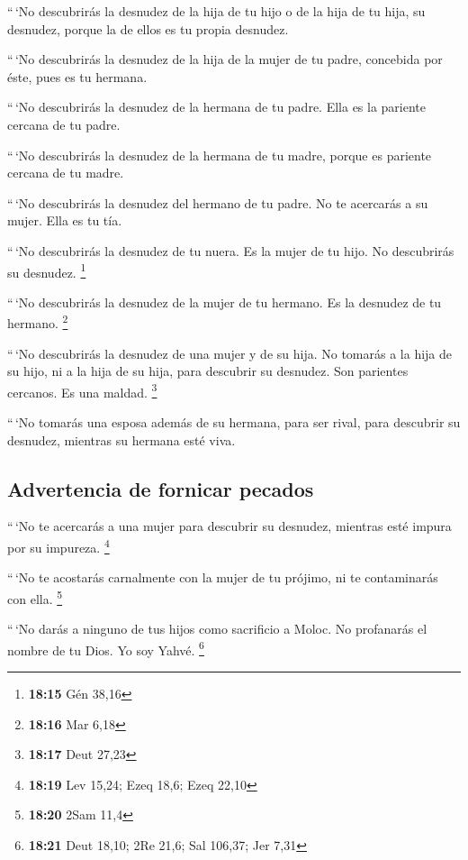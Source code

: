 \begin{paracol}{2}
 ``\,`No descubrirás la desnudez de la hija de tu hijo o
de la hija de tu hija, su desnudez, porque la de ellos es tu propia
desnudez.

 ``\,`No descubrirás la desnudez de la hija de la mujer
de tu padre, concebida por éste, pues es tu hermana.

 ``\,`No descubrirás la desnudez de la hermana de tu
padre. Ella es la pariente cercana de tu padre.

 ``\,`No descubrirás la desnudez de la hermana de tu
madre, porque es pariente cercana de tu madre.

 ``\,`No descubrirás la desnudez del hermano de tu padre.
No te acercarás a su mujer. Ella es tu tía.

 ``\,`No descubrirás la desnudez de tu nuera. Es la mujer
de tu hijo. No descubrirás su desnudez. \footnote{\textbf{18:15} Gén
  38,16}

 ``\,`No descubrirás la desnudez de la mujer de tu
hermano. Es la desnudez de tu hermano. \footnote{\textbf{18:16} Mar 6,18}

 ``\,`No descubrirás la desnudez de una mujer y de su
hija. No tomarás a la hija de su hijo, ni a la hija de su hija, para
descubrir su desnudez. Son parientes cercanos. Es una maldad.
\footnote{\textbf{18:17} Deut 27,23}

 ``\,`No tomarás una esposa además de su hermana, para
ser rival, para descubrir su desnudez, mientras su hermana esté viva.

\hypertarget{advertencia-de-fornicar-pecados}{%
\subsection{Advertencia de fornicar
pecados}\label{advertencia-de-fornicar-pecados}}

 ``\,`No te acercarás a una mujer para descubrir su
desnudez, mientras esté impura por su impureza. \footnote{\textbf{18:19}
  Lev 15,24; Ezeq 18,6; Ezeq 22,10}

 ``\,`No te acostarás carnalmente con la mujer de tu
prójimo, ni te contaminarás con ella. \footnote{\textbf{18:20} 2Sam 11,4}

 ``\,`No darás a ninguno de tus hijos como sacrificio a
Moloc. No profanarás el nombre de tu Dios. Yo soy Yahvé. \footnote{\textbf{18:21}
  Deut 18,10; 2Re 21,6; Sal 106,37; Jer 7,31}


\end{paracol}
